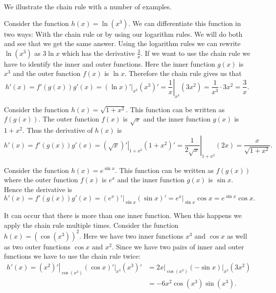 \documentclass[main.tex]{subfiles}
\begin{document}
We illustrate the chain rule with a number of examples.
\begin{example}
Consider the function $h(x) = \ln (x^3)$. We can differentiate this function in two ways: With the chain rule or by using our logarithm rules. We will do both and see that we get the same answer. Using the logarithm rules we can rewrite $\ln (x^3)$ as $3 \ln x$ which has the derivative $\frac{3}{x}$. If we want to use the chain rule we have to identify the inner and outer functions. Here the inner function $g(x)$ is $x^3$ and the outer function $f(x)$ is $\ln x$. Therefore the chain rule gives us that
\begin{equation}
h'(x) = f'(g(x))g'(x) = \left. \left( \ln x \right)' \right\rvert_{x^3} \left( x^3 \right)' = \left. \frac{1}{x} \right\rvert_{x^3} \left(3 x^2 \right) = \frac{1}{x^3} \cdot 3 x^2 = \frac{3}{x}.
\end{equation}
\end{example}
\begin{example}
Consider the function $h(x) = \sqrt{1 + x^2}$. This function can be written as $f(g(x))$. The outer function $f(x)$ is $\sqrt{x}$ and the inner function $g(x)$ is $1 + x^2$. Thus the derivative of $h(x)$ is
\begin{equation}
h'(x) = f'(g(x)) g'(x) = \left.\left(\sqrt{x} \right)'\right\rvert_{1 + x^2} \left( 1 + x^2 \right)' = \left. \frac{1}{2 \sqrt x} \right\rvert_{1 + x^2} \left(2 x \right) = \frac{x}{\sqrt{1 + x^2}}.
\end{equation}
\end{example}
\begin{example}
Consider the function $h(x) = e^{\sin x}$. This function can be written as $f(g(x))$ where the outer function $f(x)$ is $e^x$ and the inner function $g(x)$ is $\sin x$. Hence the derivative is
\begin{equation}
h'(x) = f'(g(x))g'(x) = \left.\left( e^x \right)' \right\rvert_{\sin x} \left( \sin x \right)' = \left. e^x \right\rvert_{\sin x} \cos x = e^{\sin x} \cos x.
\end{equation}
\end{example}
\begin{example}
It can occur that there is more than one inner function. When this happens we apply the chain rule multiple times. Consider the function $h(x) = \left( \cos \left( x^3 \right) \right)^2$. Here we have two inner functions $x^3$ and $\cos x$ as well as two outer functions $\cos x$ and $x^2$. Since we have two pairs of inner and outer functions we have to use the chain rule twice:
\begin{align}
h'(x) = \left. \left( x^2 \right)' \right\rvert_{\cos \left( x^3 \right)} \left. \left( \cos x \right)' \right\rvert_{x^3} \left( x^3 \right)' &= \left. 2 x \right\rvert_{\cos \left( x^3 \right)} \left. \left(-\sin x \right)\right\rvert_{x^3} \left( 3 x^2 \right) \nonumber \\
&= -6 x^2 \cos \left( x^3 \right) \sin \left( x^3 \right).
\end{align}
\end{example}
\end{document}
